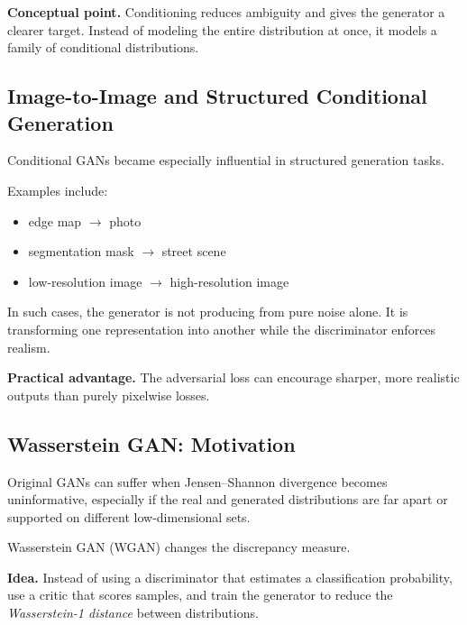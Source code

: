 \medskip

\noindent
\textbf{Conceptual point.}
Conditioning reduces ambiguity and gives the generator a clearer target. Instead of modeling the entire distribution at once, it models a family of conditional distributions.

\subsection{Image-to-Image and Structured Conditional Generation}

Conditional GANs became especially influential in structured generation tasks.

\medskip

\noindent
Examples include:
\begin{itemize}
    \item edge map $\rightarrow$ photo
    \item segmentation mask $\rightarrow$ street scene
    \item low-resolution image $\rightarrow$ high-resolution image
\end{itemize}

\medskip

\noindent
In such cases, the generator is not producing from pure noise alone. It is transforming one representation into another while the discriminator enforces realism.

\medskip

\noindent
\textbf{Practical advantage.}
The adversarial loss can encourage sharper, more realistic outputs than purely pixelwise losses.

\subsection{Wasserstein GAN: Motivation}

Original GANs can suffer when Jensen--Shannon divergence becomes uninformative, especially if the real and generated distributions are far apart or supported on different low-dimensional sets.

\medskip

\noindent
Wasserstein GAN (WGAN) changes the discrepancy measure.

\medskip

\noindent
\textbf{Idea.}
Instead of using a discriminator that estimates a classification probability, use a critic that scores samples, and train the generator to reduce the \emph{Wasserstein-1 distance} between distributions.

